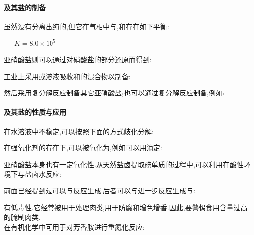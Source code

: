 \documentclass{ctexbook}
\begin{document}
\paragraph{及其盐的制备}
虽然没有分离出纯的,但它在气相中与,和存在如下平衡:
\begin{center}
    \ \ \ $K=8.0\times10^5$
\end{center}
亚硝酸盐则可以通过对硝酸盐的部分还原而得到:
\begin{center}
\end{center}
工业上采用或溶液吸收和的混合物以制备:
\begin{center}
\end{center}
然后采用复分解反应制备其它亚硝酸盐;也可以通过复分解反应制备,例如:
\begin{center}
\end{center}
\paragraph{及其盐的性质与应用}
在水溶液中不稳定,可以按照下面的方式歧化分解:
\begin{center}
\end{center}
在强氧化剂的存在下,可以被氧化为,例如可以用滴定:
\begin{center}
\end{center}
亚硝酸盐本身也有一定氧化性.从天然盐卤提取碘单质的过程中,可以利用在酸性环境下与盐卤水反应:
\begin{center}
\end{center}
前面已经提到过可以与反应生成.后者可以与进一步反应生成与:
\begin{center}
\end{center}
\indent {}有低毒性.它经常被用于处理肉类,用于防腐和增色增香.因此,要警惕食用含量过高的腌制肉类.\\
\indent {}在有机化学中可用于对芳香胺进行重氮化反应:
\begin{center}
\end{center}
\end{document}
